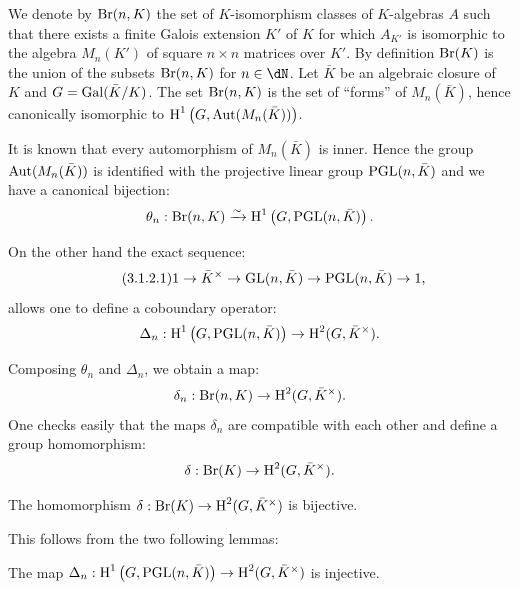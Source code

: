 \subsubsection{}\label{I:3-1-2}

We denote by $\operatorname{Br}(n,K)$ the set of $K$-isomorphism classes of
$K$-algebras $A$ such that there exists a finite Galois extension $K'$ of
$K$ for which $A_{K'}$ is isomorphic to the algebra $M_n(K')$ of
square $n\times n$ matrices over $K'$. By definition $\operatorname{Br}(K)$ is the union of the
subsets $\operatorname{Br}(n,K)$ for $n\in\dN$. Let $\bar K$ be an algebraic
closure of $K$ and $G=\operatorname{Gal}(\bar K/K)$. The set $\operatorname{Br}(n,K)$ is
the set of ``forms'' of $M_n(\bar K)$, hence canonically
isomorphic to $\operatorname{H}^1\left(G,\operatorname{Aut}(M_n(\bar K))\right)$.

It is known that every automorphism of $M_n(\bar K)$ is inner. Hence
the group $\operatorname{Aut}(M_n(\bar K))$ is identified with the projective linear
group $\operatorname{PGL}(n,\bar K)$ and we have a canonical bijection:
\[
  \theta_n : \operatorname{Br}(n,K) \xrightarrow\sim \operatorname{H}^1\left(G,\operatorname{PGL}(n,\bar K)\right)\text{.}
\]

On the other hand the exact sequence:
\begin{equation*}\tag{3.1.2.1}\label{I:eq:3-1-2-1}
  1 \to \bar K^\times \to \operatorname{GL}(n,\bar K) \to \operatorname{PGL}(n,\bar K) \to 1\text{,}
\end{equation*}
allows one to define a coboundary operator:
\[
  \Delta_n : \operatorname{H}^1\left(G,\operatorname{PGL}(n,\bar K)\right) \to \operatorname{H}^2(G,\bar K^\times)\text{.}
\]

Composing $\theta_n$ and $\Delta_n$, we obtain a map:
\[
  \delta_n : \operatorname{Br}(n,K) \to \operatorname{H}^2(G,\bar K^\times)\text{.}
\]
One checks easily that the maps $\delta_n$ are compatible with each
other and define a group homomorphism:
\[
  \delta : \operatorname{Br}(K) \to \operatorname{H}^2(G,\bar K^\times)\text{.}
\]





\begin{proposition}\label{I:3-1-3}
The homomorphism $\delta:\operatorname{Br}(K)\to \operatorname{H}^2(G,\bar K^\times)$ is bijective.
\end{proposition}

This follows from the two following lemmas:





\begin{lemma}\label{I:3-1-4}
The map
$\Delta_n:\operatorname{H}^1\left(G,\operatorname{PGL}(n,\bar K)\right)\to \operatorname{H}^2(G,\bar K^\times)$ is
injective.
\end{lemma}

